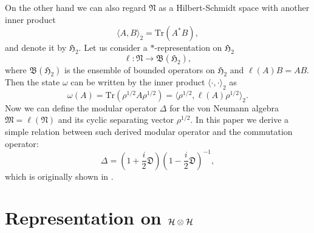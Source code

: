 \documentclass{article}
\begin{document}
On the other hand we can also regard $\mathfrak{N}$ as a Hilbert-Schmidt space with another inner product
$$
\langle A, B \rangle_2 =\mbox{Tr}(A^{\ast}B),
$$
and denote it by $\mathfrak{H}_2$.
Let us consider a $\ast$-representation on $\mathfrak{H}_2$
\begin{equation}\label{star-rep}
\ell :\mathfrak{N}\to \mathfrak{B}(\mathfrak{H}_2),
\end{equation}
where $\mathfrak{B}(\mathfrak{H}_2)$ is the ensemble of bounded operators on $\mathfrak{H}_2$
and $\ell(A)B=AB$.
Then the state $\omega$ can be written by the inner product $\langle \cdot, \cdot\rangle_2$ as 
$$
\omega(A)=\mbox{Tr}(\rho^{1/2}A\rho^{1/2})=\langle \rho^{1/2},\ell(A)\rho^{1/2}\rangle_2 .
$$
Now we can define the modular operator $\Delta$ for the von Neumann algebra $\mathfrak{M}=\ell(\mathfrak{N})$ and its cyclic separating vector $\rho^{1/2}$. 
In this paper we derive a simple relation between such derived modular operator and the commutation operator:
$$
    \Delta=\left(1+\frac{i}{2}\mathfrak{D}\right)\left(1-\frac{i}{2}\mathfrak{D}\right)^{-1},
$$
which is originally shown in \cite{Holevo_1977}.


\section{Representation on $\cal{H}\otimes\cal{H}$}
\end{document}
